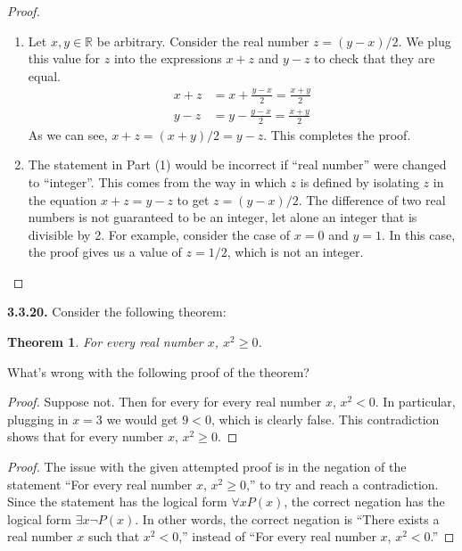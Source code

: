 \documentclass[12pt]{amsart}
\newenvironment{statement}[1]{\smallskip\noindent\color[rgb]{.6627, .3529, .6314} {\bf #1.}}{}
\newtheorem{theorem}{Theorem}
\theoremstyle{definition}
\theoremstyle{remark}
\newcommand{\BR}{\mathbb R}
\begin{document}
\begin{proof}
\hfill
\begin{enumerate}
	\item Let $x, y \in \BR$ be arbitrary. 
	Consider the real number $z = (y - x) / 2$.
	We plug this value for $z$ into the expressions $x + z$ and $y - z$ to check that they are equal.
	\begin{align*}
		x + z &= x + \frac{y - x}{2} = \frac{x + y}{2} \\
		y - z &= y - \frac{y - x}{2} = \frac{x + y}{2}
	\end{align*}
	As we can see, $x + z = (x + y) / 2 = y - z$.
	This completes the proof.
	
	\item The statement in Part (1) would be incorrect if ``real number'' were changed to ``integer''.
	This comes from the way in which $z$ is defined by 
	isolating $z$ in the equation $x + z = y - z$ to get $z = (y - x) / 2$.
	The difference of two real numbers is not guaranteed to be an integer,
	let alone an integer that is divisible by 2.
	For example, consider the case of $x = 0$ and $y = 1$.
	In this case, the proof gives us a value of $z = 1/2$, which is not an integer.
\end{enumerate}
\end{proof}


\begin{statement}{3.3.20}
Consider the following theorem:
\begin{theorem}
	For every real number $x$, $x^2 \geq 0$.
\end{theorem}
What's wrong with the following proof of the theorem?
\begin{proof}
	Suppose not.
	Then for every for every real number $x$, $x^2 < 0$.
	In particular, plugging in $x = 3$ we would get $9 < 0$, which is clearly false.
	This contradiction shows that for every number $x$, $x^2 \geq 0$.
\end{proof}
\end{statement}

\begin{proof}
The issue with the given attempted proof is in the negation of the statement ``For every real number $x$, $x^2 \geq 0$,'' to try and reach a contradiction.
Since the statement has the logical form $\forall x P(x)$, the correct negation has the logical form $\exists x \neg P(x)$.
In other words, the correct negation is ``There exists a real number $x$ such that $x^2 < 0$,'' instead of ``For every real number $x$, $x^2 < 0$.''
\end{proof}
\end{document}
